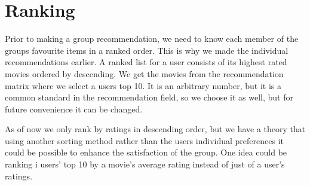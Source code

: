 \section{Ranking}\label{sec:ranking}
Prior to making a group recommendation, we need to know each member of the groups favourite items in a ranked order. This is why we made the individual recommendations earlier. A ranked list for a user consists of its highest rated movies ordered by descending. We get the movies from the recommendation matrix where we select a users top 10. It is an arbitrary number, but it is a common standard in the recommendation field, so we choose it as well, but for future convenience it can be changed. 

As of now we only rank by ratings in descending order, but we have a theory that using another sorting method rather than the users individual preferences it could be possible to enhance the satisfaction of the group. One idea could be ranking i users' top 10 by a movie's average rating instead of just of a user's ratings. 